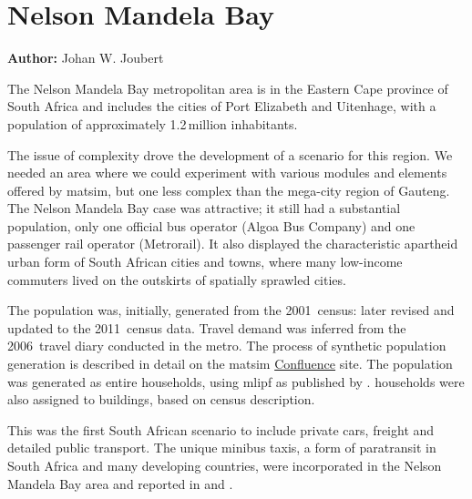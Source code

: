 \section{Nelson Mandela Bay}
\label{sec:nelsonMandelaBay}
\hfill \textbf{Author:} Johan W. Joubert


The Nelson Mandela Bay metropolitan area is in the Eastern Cape province of South Africa and includes the cities of Port Elizabeth and Uitenhage, with a population of approximately 1.2\,million inhabitants.

The issue of complexity drove the development of a scenario for this region. We needed an area where we could experiment with various modules and elements offered by \gls{matsim}, but one less complex than the mega-city region of Gauteng. The Nelson Mandela Bay case was attractive; it still had a substantial population, only one official bus operator (Algoa Bus Company) and one passenger rail operator (Metrorail). It also displayed the characteristic apartheid urban form of South African cities and towns, where many low-income commuters lived on the outskirts of spatially sprawled cities.

The population was, initially, generated from the 2001~census: later revised and updated to the 2011~census data. Travel demand was inferred from the 2006~travel diary conducted in the metro. The process of synthetic population generation is described in detail on the \gls{matsim} \href{https://matsim.atlassian.net/wiki/display/MATPUB/South+Africa}{Confluence} site. The population was generated as entire households, using \gls{mlipf} as published by \citet[][]{MuellerKAxhausen_LATSIS_2012}. households were also assigned to buildings, based on census description.

This was the first South African scenario to include private cars, freight and detailed public transport. The unique minibus taxis, a form of paratransit in South Africa and many developing countries, were incorporated in the Nelson Mandela Bay area and reported in \citet[][]{Roeder2013MasterMinibus} and \citet[][]{NeumannEtAl2014MinibusRSA}.

